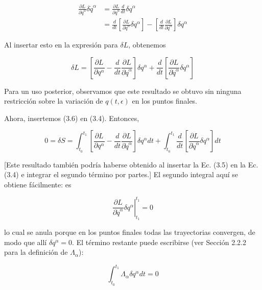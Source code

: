 $$
\begin{aligned}
\frac{\partial L}{\partial \dot{q}^{\alpha}} \delta \dot{q}^{\alpha} & =\frac{\partial L}{\partial \dot{q}^{\alpha}} \frac{d}{d t} \delta q^{\alpha} \\
& =\frac{d}{d t}\left[\frac{\partial L}{\partial \dot{q}^{\alpha}} \delta q^{\alpha}\right]-\left[\frac{d}{d t} \frac{\partial L}{\partial \dot{q}^{\alpha}}\right] \delta q^{\alpha}
\end{aligned}
$$

Al insertar esto en la expresión para $ \delta L $, obtenemos


\begin{equation*}
\delta L=\left[\frac{\partial L}{\partial q^{\alpha}}-\frac{d}{d t} \frac{\partial L}{\partial \dot{q}^{\alpha}}\right] \delta q^{\alpha}+\frac{d}{d t}\left[\frac{\partial L}{\partial \dot{q}^{\alpha}} \delta q^{\alpha}\right] \tag{3.6}
\end{equation*}


Para un uso posterior, observamos que este resultado se obtuvo sin ninguna restricción sobre la variación de $ q(t, \epsilon) $ en los puntos finales.

Ahora, insertemos (3.6) en (3.4). Entonces,


\begin{equation*}
0=\delta S=\int_{t_{0}}^{t_{1}}\left[\frac{\partial L}{\partial q^{\alpha}}-\frac{d}{d t} \frac{\partial L}{\partial \dot{q}^{\alpha}}\right] \delta q^{\alpha} d t+\int_{t_{0}}^{t_{1}} \frac{d}{d t}\left[\frac{\partial L}{\partial \dot{q}^{\alpha}} \delta q^{\alpha}\right] d t \tag{3.7}
\end{equation*}


[Este resultado también podría haberse obtenido al insertar la Ec. (3.5) en la Ec. (3.4) e integrar el segundo término por partes.] El segundo integral aquí se obtiene fácilmente: es

$$
\left.\frac{\partial L}{\partial \dot{q}^{\alpha}} \delta q^{\alpha}\right|_{t_{1}}^{t_{1}}=0
$$

lo cual se anula porque en los puntos finales todas las trayectorias convergen, de modo que allí $ \delta q^{\alpha}=0 $. El término restante puede escribirse (ver Sección 2.2.2 para la definición de $ \Lambda_{\alpha} $):


\begin{equation*}
\int_{t_{0}}^{t_{1}} \Lambda_{\alpha} \delta q^{\alpha} d t=0 \tag{3.8}
\end{equation*}


